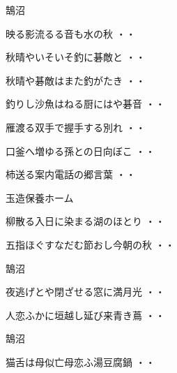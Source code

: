 \vspace{0.4cm}
鵠沼
\begin{shiika}映る影流るる音も水の秋
\hfill{・・}\end{shiika}
\begin{shiika}秋晴やいそいそ釣に碁敵と
\hfill{・・}\end{shiika}
\vspace{0.4cm}
\begin{shiika}秋晴や碁敵はまた釣がたき
\hfill{・・}\end{shiika}
\vspace{0.4cm}
\begin{shiika}釣りし沙魚はねる厨にはや碁音
\hfill{・・}\end{shiika}
\vspace{0.4cm}
\begin{shiika}雁渡る双手で握手する別れ
\hfill{・・}\end{shiika}
\vspace{0.4cm}
\begin{shiika}口釜へ増ゆる孫との日向ぼこ
\hfill{・・}\end{shiika}
\vspace{0.4cm}
\begin{shiika}柿送る案内電話の郷言葉
\hfill{・・}\end{shiika}
\vspace{0.4cm}
玉造保養ホーム
\begin{shiika}柳散る入日に染まる湖のほとり
\hfill{・・}\end{shiika}
\begin{shiika}五指ほぐすなだむ節おし今朝の秋
\hfill{・・}\end{shiika}
\vspace{0.4cm}
鵠沼
\begin{shiika}夜逃げとや閉ざせる窓に満月光
\hfill{・・}\end{shiika}
\begin{shiika}人恋ふかに垣越し延び来青き蔦
\hfill{・・}\end{shiika}
\vspace{0.4cm}
鵠沼
\begin{shiika}猫舌は母似亡母恋ふ湯豆腐鍋
\hfill{・・}\end{shiika}

